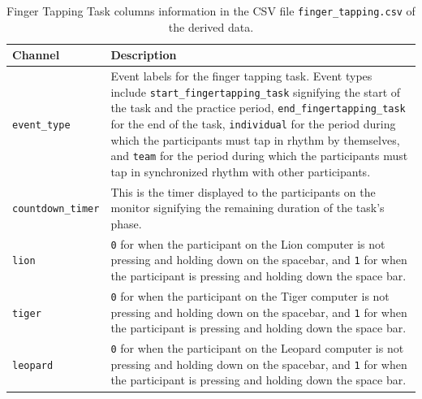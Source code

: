\begin{table}[h]
\centering
\begin{tabularx}{\textwidth}{|l|X|}
\hline
\textbf{Channel} & \textbf{Description} \\
\hline
\texttt{event\_type} & Event labels for the finger tapping task. Event types include \texttt{start\_fingertapping\_task} signifying the start of the task and the practice period, \texttt{end\_fingertapping\_task} for the end of the task, \texttt{individual} for the period during which the participants must tap in rhythm by themselves, and \texttt{team} for the period during which the participants must tap in synchronized rhythm with other participants.\\
\hline
\texttt{countdown\_timer} & This is the timer displayed to the participants on the monitor signifying the remaining duration of the task's phase.\\
\hline
\texttt{lion} & \texttt{0} for when the participant on the Lion computer is not pressing and holding down on the spacebar, and \texttt{1} for when the participant is pressing and holding down the space bar.\\
\hline
\texttt{tiger} & \texttt{0} for when the participant on the Tiger computer is not pressing and holding down on the spacebar, and \texttt{1} for when the participant is pressing and holding down the space bar.\\
\hline
\texttt{leopard} & \texttt{0} for when the participant on the Leopard computer is not pressing and holding down on the spacebar, and \texttt{1} for when the participant is pressing and holding down the space bar.\\
\hline
\end{tabularx}
\caption{Finger Tapping Task columns information in the CSV file \texttt{finger\_tapping.csv} of the derived data.}
\label{tab:finger_task_columns}
\end{table}


